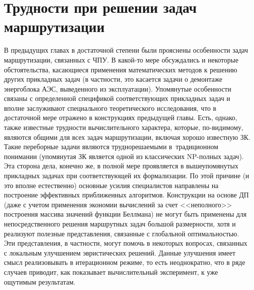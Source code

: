 
\section{
  Трудности при решении
  задач маршрутизации
}
\label{sect:4.1}
\setcounter{equation}{0}

В предыдущих главах в достаточной степени были прояснены особенности задач
маршрутизации, связанных с ЧПУ.
В какой-то мере обсуждались и некоторые
обстоятельства, касающиеся применения математических методов к решению других
прикладных задач
(в частности, это касается задачи о демонтаже энергоблока
АЭС, выведенного из эксплуатации).
Упомянутые особенности связаны
с определенной спецификой соответствующих прикладных задач
и вполне
заслуживают специального теоретического исследования,
что в достаточной
мере отражено в конструкциях предыдущей главы.
Есть, однако, также
известные трудности вычислительного характера, которые, по-видимому,
являются общими для всех задач  маршрутизации,
включая хорошо известную ЗК.
Такие переборные задачи являются труднорешаемыми в~традиционном понимании
(упомянутая ЗК является одной из классических NP-полных задач).
Эта сторона дела, конечно же, в полной мере проявляется
в вышеупомянутых
прикладных задачах при соответствующей  их формализации.
По этой причине
(и это вполне естественно)
основные усилия специалистов направлены
на построение эффективных приближенных алгоритмов.
Конструкции на основе ДП
(даже с учетом применения экономии вычислений за счет <<неполного>>
построения массива значений функции Беллмана)
не могут быть применены для
непосредственного решения маршрутных задач большой размерности,
хотя и реализуют полезные представления,
связанные с глобальной оптимальностью.
Эти представления, в частности, могут помочь в некоторых вопросах,
связанных с локальным улучшением эвристических решений.
Данные улучшения
имеет смысл реализовывать в итерационном режиме, то есть неоднократно,
что в ряде случаев приводит, как показывает вычислительный эксперимент,
к уже ощутимым результатам.

